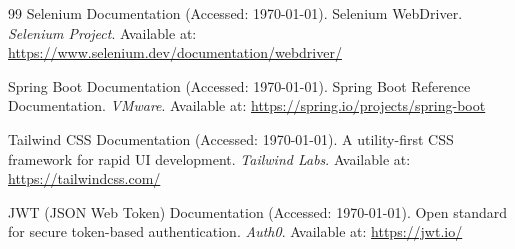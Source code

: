 \documentclass[12pt, a4paper]{report}
\begin{document}
\begin{thebibliography}{99}
 Selenium Documentation (Accessed: \today). Selenium WebDriver. \textit{Selenium Project}. Available at: \url{https://www.selenium.dev/documentation/webdriver/}

 Spring Boot Documentation (Accessed: \today). Spring Boot Reference Documentation. \textit{VMware}. Available at: \url{https://spring.io/projects/spring-boot}

 Tailwind CSS Documentation (Accessed: \today). A utility-first CSS framework for rapid UI development. \textit{Tailwind Labs}. Available at: \url{https://tailwindcss.com/}

 JWT (JSON Web Token) Documentation (Accessed: \today). Open standard for secure token-based authentication. \textit{Auth0}. Available at: \url{https://jwt.io/}


\end{thebibliography}

\end{document}
